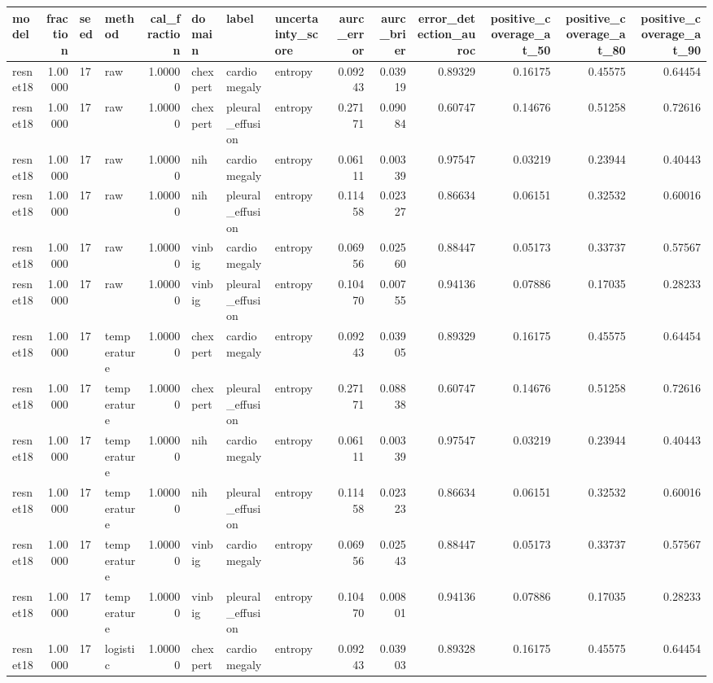 \begin{tabular}{lrllrlllrrrrrr}
\toprule
model & fraction & seed & method & cal\_fraction & domain & label & uncertainty\_score & aurc\_error & aurc\_brier & error\_detection\_auroc & positive\_coverage\_at\_50 & positive\_coverage\_at\_80 & positive\_coverage\_at\_90 \\
\midrule
resnet18 & 1.00000 & 17 & raw & 1.00000 & chexpert & cardiomegaly & entropy & 0.09243 & 0.03919 & 0.89329 & 0.16175 & 0.45575 & 0.64454 \\
resnet18 & 1.00000 & 17 & raw & 1.00000 & chexpert & pleural\_effusion & entropy & 0.27171 & 0.09084 & 0.60747 & 0.14676 & 0.51258 & 0.72616 \\
resnet18 & 1.00000 & 17 & raw & 1.00000 & nih & cardiomegaly & entropy & 0.06111 & 0.00339 & 0.97547 & 0.03219 & 0.23944 & 0.40443 \\
resnet18 & 1.00000 & 17 & raw & 1.00000 & nih & pleural\_effusion & entropy & 0.11458 & 0.02327 & 0.86634 & 0.06151 & 0.32532 & 0.60016 \\
resnet18 & 1.00000 & 17 & raw & 1.00000 & vinbig & cardiomegaly & entropy & 0.06956 & 0.02560 & 0.88447 & 0.05173 & 0.33737 & 0.57567 \\
resnet18 & 1.00000 & 17 & raw & 1.00000 & vinbig & pleural\_effusion & entropy & 0.10470 & 0.00755 & 0.94136 & 0.07886 & 0.17035 & 0.28233 \\
resnet18 & 1.00000 & 17 & temperature & 1.00000 & chexpert & cardiomegaly & entropy & 0.09243 & 0.03905 & 0.89329 & 0.16175 & 0.45575 & 0.64454 \\
resnet18 & 1.00000 & 17 & temperature & 1.00000 & chexpert & pleural\_effusion & entropy & 0.27171 & 0.08838 & 0.60747 & 0.14676 & 0.51258 & 0.72616 \\
resnet18 & 1.00000 & 17 & temperature & 1.00000 & nih & cardiomegaly & entropy & 0.06111 & 0.00339 & 0.97547 & 0.03219 & 0.23944 & 0.40443 \\
resnet18 & 1.00000 & 17 & temperature & 1.00000 & nih & pleural\_effusion & entropy & 0.11458 & 0.02323 & 0.86634 & 0.06151 & 0.32532 & 0.60016 \\
resnet18 & 1.00000 & 17 & temperature & 1.00000 & vinbig & cardiomegaly & entropy & 0.06956 & 0.02543 & 0.88447 & 0.05173 & 0.33737 & 0.57567 \\
resnet18 & 1.00000 & 17 & temperature & 1.00000 & vinbig & pleural\_effusion & entropy & 0.10470 & 0.00801 & 0.94136 & 0.07886 & 0.17035 & 0.28233 \\
resnet18 & 1.00000 & 17 & logistic & 1.00000 & chexpert & cardiomegaly & entropy & 0.09243 & 0.03903 & 0.89328 & 0.16175 & 0.45575 & 0.64454 \\

\end{tabular}
